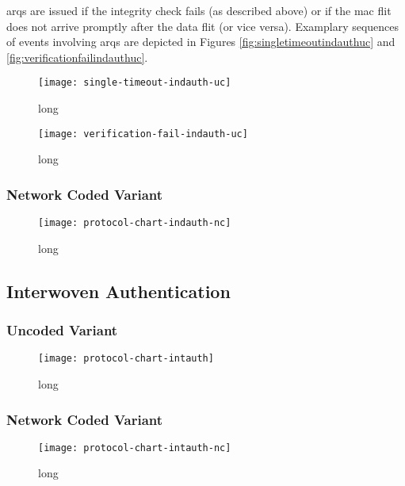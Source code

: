 \Glspl{arq} are issued if the integrity check fails (as described above) or if the \gls{mac} flit does not arrive promptly after the data flit (or
vice versa). Examplary sequences of events involving \glspl{arq} are depicted in Figures \vref{fig:singletimeoutindauthuc} and
\vref{fig:verificationfailindauthuc}.

\begin{figure}
    \centering
    \texttt{[image: single-timeout-indauth-uc]}
    \caption[short]{long}
    \label{fig:singletimeoutindauthuc}
\end{figure}

\begin{figure}
    \centering
    \texttt{[image: verification-fail-indauth-uc]}
    \caption[short]{long}
    \label{fig:verificationfailindauthuc}
\end{figure}

\subsubsection{Network Coded Variant}
\begin{figure}
    \centering
    \texttt{[image: protocol-chart-indauth-nc]}
    \caption[short]{long}
    \label{fig:protchartindauthnc}
\end{figure}


\subsection{Interwoven Authentication}\label{subsec:intauth}
\subsubsection{Uncoded Variant}
\begin{figure}
    \centering
    \texttt{[image: protocol-chart-intauth]}
    \caption[short]{long}
    \label{fig:protchartintauth}
\end{figure}

\subsubsection{Network Coded Variant}
\begin{figure}
    \centering
    \texttt{[image: protocol-chart-intauth-nc]}
    \caption[short]{long}
    \label{fig:protchartintauthnc}
\end{figure}

